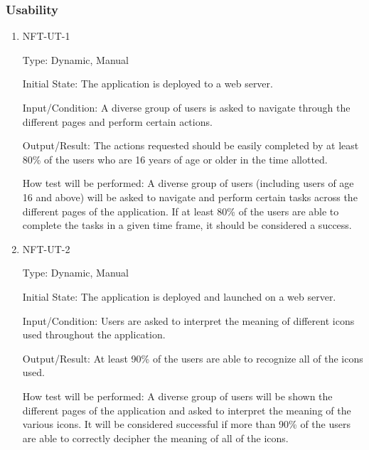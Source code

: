 \documentclass[12pt, titlepage]{article}
\begin{document}
\subsubsection{Usability}
\begin{enumerate}
\item{NFT-UT-1}

Type: Dynamic, Manual
					
Initial State: The application is deployed to a web server.
					
Input/Condition: A diverse group of users is asked to navigate through the different pages and perform certain actions.
					
Output/Result: The actions requested should be easily completed by at least 80\% of the users who are 16 years of age or older in the time allotted.
					
How test will be performed: A diverse group of users (including users of age 16 and above) will be asked to navigate and perform certain tasks across the different pages of the application. If at least 80\% of the users are able to complete the tasks in a given time frame, it should be considered a success.

\item{NFT-UT-2}

Type: Dynamic, Manual
					
Initial State: The application is deployed and launched on a web server.
					
Input/Condition: Users are asked to interpret the meaning of different icons used throughout the application.
					
Output/Result: At least 90\% of the users are able to recognize all of the icons used. 
					
How test will be performed: A diverse group of users will be shown the different pages of the application and asked to interpret the meaning of the various icons. It will be considered successful if more than 90\% of the users are able to correctly decipher the meaning of all of the icons.
\end{enumerate}
\end{document}
